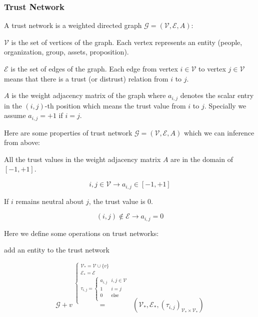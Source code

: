 \documentclass{article}
\begin{document}
\subsubsection{Trust Network}

A trust network is a weighted directed graph \(\mathcal{G}=(\mathcal{V},\mathcal{E},A)\):

\(\mathcal{V}\) is the set of vertices of the graph. Each vertex represents an entity (people, organization, group, assets, proposition).

\(\mathcal{E}\) is the set of edges of the graph. Each edge from vertex \(i\in \mathcal{V}\) to vertex \(j\in \mathcal{V}\) means that there is a
trust (or distrust) relation from \(i\) to \(j\).

\(A\) is the weight adjacency matrix of the graph where \(a_{i,j}\) denotes the scalar entry in the \((i,j)\)-th position which means the trust value
from \(i\) to \(j\). Specially we assume \(a_{i,j}=+1\) if \(i=j\).

Here are some properties of trust network \(\mathcal{G}=(\mathcal{V},\mathcal{E},A)\) which we can inference from above:

All the trust values in the weight adjacency matrix \(A\) are in the domain of \([-1,+1]\).

\begin{equation}
i,j\in \mathcal{V}\to a_{i,j}\in [-1,+1]
\end{equation}

If \(i\) remains neutral about \(j\), the trust value is \(0\).

\begin{equation}
(i,j)\notin \mathcal{E}\to a_{i,j}=0
\end{equation}

Here we define some operations on trust networks:

add an entity to the trust network

\begin{equation}
\mathcal{G}+v\overset{\left\{
\begin{array}{c}
 \mathcal{V}_*=\mathcal{V}\cup \{v\} \\
 \mathcal{E}_*=\mathcal{E} \\
 \tau _{i,j}=\left\{
\begin{array}{cc}
 a_{i,j} & i,j\in \mathcal{V} \\
 1 & i=j \\
 0 & \text{else} \\
\end{array}
\right. \\
\end{array}
\right.}{=}\left(\mathcal{V}_*,\mathcal{E}_*,\left(\tau _{i,j}\right)_{\mathcal{V}_*\times \mathcal{V}_*}\right)
\end{equation}
\end{document}
